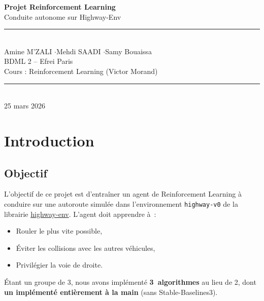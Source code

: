 \documentclass[11pt, a4paper]{article}
\begin{document}
\begin{titlepage}
\centering
\vspace*{2cm}

{\Huge\bfseries\color{bleu} Projet Reinforcement Learning\\[8pt]}
{\LARGE Conduite autonome sur Highway-Env\\[24pt]}

\rule{\textwidth}{1pt}\\[16pt]

{\Large Amine M'ZALI \quad$\cdot$\quad Mehdi SAADI \quad$\cdot$\quad Samy Bouaissa}\\[12pt]

{\large BDML 2 -- Efrei Paris}\\[6pt]
{\large Cours : Reinforcement Learning (Victor Morand)}\\[24pt]

\rule{\textwidth}{1pt}\\[16pt]

{\large 25 mars 2026}

\vfill
\end{titlepage}

\tableofcontents
\newpage

\section{Introduction}

\subsection{Objectif}

L'objectif de ce projet est d'entraîner un agent de Reinforcement Learning à conduire sur une autoroute simulée dans l'environnement \texttt{highway-v0} de la librairie \href{https://github.com/Farama-Foundation/HighwayEnv}{highway-env}. L'agent doit apprendre à~:
\begin{itemize}[nosep]
    \item Rouler le plus vite possible,
    \item Éviter les collisions avec les autres véhicules,
    \item Privilégier la voie de droite.
\end{itemize}

Étant un groupe de 3, nous avons implémenté \textbf{3~algorithmes} au lieu de 2, dont \textbf{un implémenté entièrement à la main} (sans Stable-Baselines3).
\end{document}
